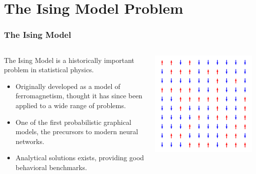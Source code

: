 \documentclass[aspectratio=169, 12pt]{beamer}
\begin{document}
\section{The Ising Model Problem}

\begin{frame}
    \frametitle{The Ising Model}

    \begin{columns}
        \begin{column}{.6\textwidth}
            
            The Ising Model is a historically important problem in statistical physics. 

            \begin{itemize}
                \item Originally developed as a model of ferromagnetism, thought it has since been applied to a wide range of problems. 
                \item One of the first probabilistic graphical models, the precursors to modern neural networks. 
                \item Analytical solutions exists, providing good behavioral benchmarks. 
            \end{itemize}
            
        \end{column}
        \begin{column}{.4\textwidth}
            \includegraphics[width=\textwidth]{images/ising-spins.png}
        \end{column}
    \end{columns}
\end{frame}
\end{document}
